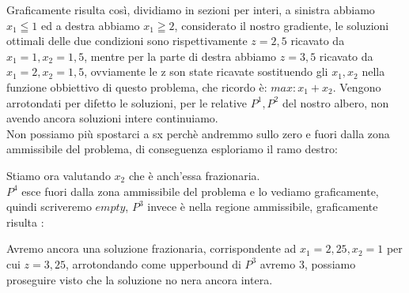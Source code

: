 \documentclass{article}
\begin{document}
Graficamente risulta così, dividiamo in sezioni per interi, a sinistra abbiamo $x_1 \leqq 1$ ed a destra abbiamo $x_1 \geqq 2$, considerato il nostro gradiente, le soluzioni ottimali delle due condizioni sono rispettivamente $z=2,5$ ricavato da $x_1 = 1, x_2=1,5$, mentre per la parte di destra abbiamo $z=3,5$ ricavato da $x_1 = 2, x_2=1,5$, ovviamente le z son state ricavate sostituendo gli $x_1,x_2$ nella funzione obbiettivo di questo problema, che ricordo è: $max:x_1+x_2$.
Vengono arrotondati per difetto le soluzioni, per le relative $P^1,P^2$ del nostro albero, non avendo ancora soluzioni intere continuiamo.\\
Non possiamo più spostarci a sx perchè andremmo sullo zero e fuori dalla zona ammissibile del problema, di conseguenza esploriamo il ramo destro:\\
\begin{center}
\end{center}
Stiamo ora valutando $x_2$ che è anch'essa frazionaria.\\
$P^4$ esce fuori dalla zona ammissibile del problema e lo vediamo graficamente, quindi scriveremo $empty$, $P^3$ invece è nella regione ammissibile, graficamente risulta :\\
\begin{center}
\end{center}
Avremo ancora una soluzione frazionaria, corrispondente ad $x_1 = 2,25, x_2=1$ per cui $z=3,25$, arrotondando come upperbound di $P^3$ avremo $3$, possiamo proseguire visto che la soluzione no nera ancora intera.\\
\end{document}
